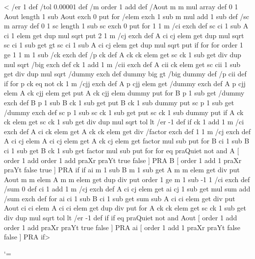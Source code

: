 %
\def\tx@GaussSolve{GaussSolve }
<{%
  /er 1 def  %
  /tol 0.00001 def %
  /m order 1 add def %
  /Aout m m mul array def %
  0 1 Aout length 1 sub { Aout exch 0 put } for
  /elem { exch 1 sub m mul add 1 sub } def %
  /sc m array def %
  0 1 sc length 1 sub { sc exch 0 put } for
  1 1 m { /ci exch def
    sc
    ci 1 sub
    A ci 1 elem get
    dup mul sqrt
    put
    2 1 m { /cj exch def
      A ci cj elem get
      dup mul sqrt
      sc ci 1 sub get gt {%
      sc
      ci 1 sub
      A ci cj elem get
      dup mul sqrt
      put } if
    } for
  } for
  order 1 ge {%
  1 1 m 1 sub { /ck exch def
    /p ck def
    A ck ck elem get
    sc ck 1 sub get div
    dup mul sqrt
    /big exch def
    ck 1 add 1 m {/cii exch def
      A cii ck elem get
      sc cii 1 sub get div
      dup mul sqrt
      /dummy exch def
      dummy big gt { /big dummy def /p cii def } if
    } for
    p ck eq not {
    ck 1 m {/cjj exch def
      A p cjj elem get
      /dummy exch def
      A p cjj elem
      A ck cjj elem get
      put
      A ck cjj elem
      dummy
      put
    } for
    B p 1 sub get
    /dummy exch def
    B p 1 sub
    B ck 1 sub get
    put
    B ck 1 sub
    dummy
    put
    sc p 1 sub get
    /dummy exch def
    sc p 1 sub
    sc ck 1 sub get
    put
    sc ck 1 sub
    dummy
    put
    } if 
    A ck ck elem get
    sc ck 1 sub get div
    dup mul sqrt tol lt { /er -1 def } if
    ck 1 add 1 m { /ci exch def
      A ci ck elem get
      A ck ck elem get div
      /factor exch def
      1 1 m { /cj exch def  %
        A ci cj elem %
        A ci cj elem get
        A ck cj elem get
        factor
        mul sub %
        put
      } for
      B ci 1 sub %
      B ci 1 sub get
      B ck 1 sub get
      factor
      mul sub %
      put
    } for
  } for
    \Pst@Debug{} eq praQuiet not and {
    A [ order 1 add order 1 add praXr praYt \psk@MaScale\space true false ] PRA
    B [ order 1 add 1 praXr praYt \psk@MaScale\space false true ] PRA
  } if
  } if
  ai m 1 sub
  B m 1 sub get
  A m m elem get
  div put
  Aout m m elem
  A m m elem get dup div
  put
  order 1 ge {%
  m 1 sub -1 1 { /ci exch def
    /sum 0 def
    ci 1 add 1 m { /cj exch def
      A ci cj elem get
      ai cj 1 sub get
      mul sum add
      /sum exch def
    } for
    ai ci 1 sub
    B ci 1 sub get
    sum sub
    A ci ci elem get
    div put
    Aout ci ci elem
    A ci ci elem get dup div
    put
  } for
  A ck ck elem get
  sc ck 1 sub get div
  dup mul sqrt tol lt { /er -1 def } if
  } if
  \Pst@Debug{} eq praQuiet not and {
  Aout [ order 1 add order 1 add praXr praYt \psk@MaScale\space true false ] PRA
  ai [ order 1 add 1 praXr praYt \psk@MaScale\space false false ] PRA } if}>

%
\catcode`\@=\PstAtCode\relax
%
\endinput

